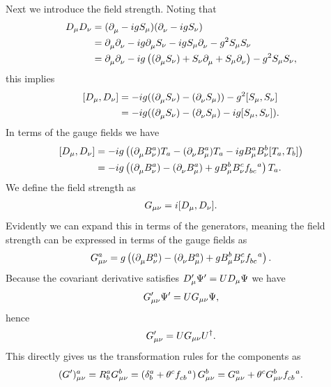 Next we introduce the field strength. Noting that
\begin{align*}
	D_{\mu}D_{\nu} &= (\partial^{}_{\mu} - igS_{\mu})(\partial^{}_{\nu} - igS_{\nu}) \\
	               &= \partial^{}_{\mu}\partial^{}_{\nu} - ig\partial^{}_{\mu}S_{\nu} - igS_{\mu}\partial^{}_{\nu} - g^{2}S_{\mu}S_{\nu} \\
	               &= \partial^{}_{\mu}\partial^{}_{\nu} - ig\left((\partial^{}_{\mu}S_{\nu}) + S_{\nu}\partial^{}_{\mu} + S_{\mu}\partial^{}_{\nu}\right) - g^{2}S_{\mu}S_{\nu},
\end{align*}
this implies
\begin{align*}
	\comm{D_{\mu}}{D_{\nu}} &= -ig((\del{}{\mu}S_{\nu}) - (\del{}{\nu}S_{\mu})) - g^{2}\comm{S_{\mu}}{S_{\nu}} \\
	                        &= -ig((\del{}{\mu}S_{\nu}) - (\del{}{\nu}S_{\mu}) - ig\comm{S_{\mu}}{S_{\nu}}).
\end{align*}
In terms of the gauge fields we have
\begin{align*}
	\comm{D_{\mu}}{D_{\nu}} &= -ig\left((\del{}{\mu}B_{\nu}^{a})T_{a} - (\del{}{\nu}B_{\mu}^{a})T_{a} - igB_{\mu}^{a}B_{\nu}^{b}\comm{T_{a}}{T_{b}}\right) \\
	                        &= -ig\left((\del{}{\mu}B_{\nu}^{a}) - (\del{}{\nu}B_{\mu}^{a}) + gB_{\mu}^{b}B_{\nu}^{c}\srconst{bc}{a}\right)T_{a}.
\end{align*}
We define the field strength as
\begin{align*}
	G_{\mu\nu} = i\comm{D_{\mu}}{D_{\nu}}.
\end{align*}
Evidently we can expand this in terms of the generators, meaning the field strength can be expressed in terms of the gauge fields as
\begin{align*}
	G_{\mu\nu}^{a} = g\left((\del{}{\mu}B_{\nu}^{a}) - (\del{}{\nu}B_{\mu}^{a}) + gB_{\mu}^{b}B_{\nu}^{c}\srconst{bc}{a}\right).
\end{align*}
Because the covariant derivative satisfies $D_{\mu}^{\prime}\Psi^{\prime} = UD_{\mu}\Psi$ we have
\begin{align*}
	G_{\mu\nu}^{\prime}\Psi^{\prime} = UG_{\mu\nu}\Psi,
\end{align*}
hence
\begin{align*}
	G_{\mu\nu}^{\prime} = UG_{\mu\nu}U^{\dagger}.
\end{align*}
This directly gives us the transformation rules for the components as
\begin{align*}
	(G\p)_{\mu\nu}^{a} = R_{b}^{a}G_{\mu\nu}^{b} = \left(\kdelta{a}{b} + \theta^{c}\srconst{cb}{a}\right)G_{\mu\nu}^{b} = G_{\mu\nu}^{a} + \theta^{c}G_{\mu\nu}^{b}\srconst{cb}{a}.
\end{align*}

